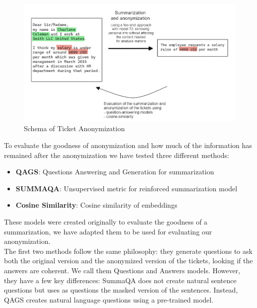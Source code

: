 \begin{figure}[h] 
    \includegraphics[width=\textwidth]{images/ticket_anonymization_schema.png}
    \caption{Schema of Ticket Anonymization}
    \label{fig:schema_ticket_anonymization}
\end{figure}    
To evaluate the goodness of anonymization and how much of the information has remained after the anonymization we have tested three different methods:
\begin{itemize}
    \item \textbf{QAGS}: Questions Answering and Generation for summarization
    \item \textbf{SUMMAQA}: Unsupervised metric for reinforced summarization model 
    \item \textbf{Cosine Similarity}: Cosine similarity of embeddings
\end{itemize}  
These models were created originally to evaluate the goodness of a summarization, we have adapted them to be used for evaluating our anonymization. \\
The first two methods follow the same philosophy: they generate questions to ask both the original version and the anonymized version of the tickets, looking if the answers are coherent. We call them Questions and Answers models.
However, they have a few key differences: SummaQA does not create natural sentence questions but uses as questions the masked version of the sentences. Instead, QAGS creates natural language questions using a pre-trained model.
